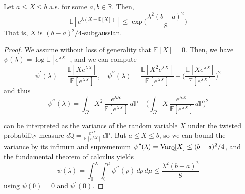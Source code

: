   \begin{lemma}
    \label{thm:hoeffdings-lemma}
  Let $a \leq X \leq b$ a.s. for some $a, b \in \mathbb{R}$. Then, 
  \begin{equation}
    \mathbb{E}[e^{\lambda(X - \mathbb{E}[X])}] \leq \exp \bigg( \frac{\lambda^2 (b - a)^2}{8} \bigg)
  \end{equation}
  That is, $X$ is $(b-a)^2 /4$-subgaussian. 
  \end{lemma}
  \begin{proof}
  We assume without loss of generality that $\mathbb{E}[X] = 0$. Then, we have $\psi(\lambda) = \log \mathbb{E}[ e^{\lambda X}]$, and we can compute 
  \begin{equation}
    \psi^\prime (\lambda) = \frac{\mathbb{E}[X e^{\lambda X}]}{\mathbb{E}[e^{\lambda X}]}, \quad \psi^{\prime\prime} (\lambda) = \frac{\mathbb{E}[X^2 e^{\lambda X}]}{\mathbb{E}[e^{\lambda X}]} - \bigg( \frac{\mathbb{E}[X e^{\lambda X}]}{\mathbb{E}[e^{\lambda X}]} \bigg)^2
  \end{equation}
  and thus 
  \begin{equation}
    \psi^{\prime\prime} (\lambda) = \int_\Omega X^2 \, \frac{e^{\lambda X}}{\mathbb{E}[e^{\lambda X}]} \,d\mathbb{P} - \bigg( \int_\Omega X \, \frac{e^{\lambda X}}{\mathbb{E}[e^{\lambda X}]} \,d\mathbb{P} \bigg)^2
  \end{equation}
   
  can be interpreted as the variance of the \hyperref[prob-def:random-variable]{random variable} $X$ under the twisted probability measure $d\mathbb{Q} = \frac{e^{\lambda X}}{\mathbb{E}[e^{\lambda X}]} \,d\mathbb{P}$. But $a \leq X \leq b$, so we can bound the variance by its infimum and suprememum $\psi^{\prime\prime} (\lambda) = \operatorname{Var}_\mathbb{Q} [X] \leq (b-a)^2 / 4$, and the fundamental theorem of calculus yields 
  \begin{equation}
    \psi(\lambda) = \int_0^\lambda \int_0^\mu \psi^{\prime\prime} (\rho) \, d\rho \, d\mu \leq \frac{\lambda^2 (b - a)^2}{8}
  \end{equation}
  using $\psi(0) = 0$ and $\psi^\prime (0)$. 
  \end{proof}

